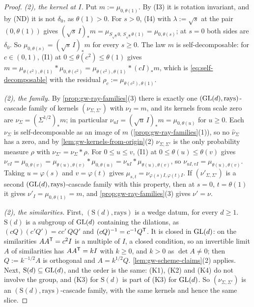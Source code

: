 \begin{proof}
\emph{(2), the kernel at $I$.} Put $m := \mu_{0,\theta(1)}$. By (I3) it is rotation invariant, and
by (ND) it is not $\delta_0$, as $\theta(1) > 0$. For $s > 0$, (I4) with $\lambda := \sqrt s$ at the
pair $(0, \theta(1))$ gives
$(\sqrt s\,I)_*m = \mu_{S_{\sqrt s}0,\,S_{\sqrt s}\theta(1)} = \mu_{0,\theta(s)}$; at $s = 0$ both
sides are $\delta_0$. So $\mu_{0,\theta(s)} = (\sqrt s\,I)_*m$ for every $s \ge 0$. The law $m$ is
self-decomposable: for $c \in (0,1)$, (I1) at $0 \le \theta(c^2) \le \theta(1)$ gives
$m = \mu_{\theta(c^2),\theta(1)} * \mu_{0,\theta(c^2)} = \mu_{\theta(c^2),\theta(1)} * (cI)_*m$, which
is \ref{eq:self-decomposable} with the residual $\rho_c := \mu_{\theta(c^2),\theta(1)}$.

\emph{(2), the family.} By \ref{prop:gw-ray-families}(3) there is exactly one
$(\mathrm{GL}(d), \text{rays})$-cascade family of kernels $(\nu_{\Sigma,\Sigma'})$ with $\nu_I = m$, and its
kernels from scale zero are $\nu_\Sigma = (\Sigma^{1/2})_*m$; in particular
$\nu_{uI} = (\sqrt u\,I)_*m = \mu_{0,\theta(u)}$ for $u \ge 0$. Each $\nu_\Sigma$ is
self-decomposable as an image of $m$ (\ref{prop:gw-ray-families}(1)), so no $\widehat\nu_\Sigma$ has
a zero, and by \ref{lem:gw-kernels-from-origin}(2) $\nu_{\Sigma,\Sigma'}$ is the only probability
measure $\rho$ with $\nu_{\Sigma'} = \nu_\Sigma * \rho$. For $0 \le u \le v$, (I1) at
$0 \le \theta(u) \le \theta(v)$ gives
$\nu_{vI} = \mu_{0,\theta(v)} = \mu_{\theta(u),\theta(v)} * \mu_{0,\theta(u)} = \nu_{uI} *
\mu_{\theta(u),\theta(v)}$, so $\nu_{uI,vI} = \mu_{\theta(u),\theta(v)}$. Taking $u = \varphi(s)$ and
$v = \varphi(t)$ gives $\mu_{s,t} = \nu_{\varphi(s)I,\varphi(t)I}$. If $(\nu'_{\Sigma,\Sigma'})$ is a
second $(\mathrm{GL}(d), \text{rays})$-cascade family with this property, then at $s = 0$, $t = \theta(1)$ it
gives $\nu'_I = \mu_{0,\theta(1)} = m$, and \ref{prop:gw-ray-families}(3) gives $\nu' = \nu$.

\emph{(2), the similarities.} First, $(\mathrm S(d), \text{rays})$ is a wedge datum, for every
$d \ge 1$. $\mathrm S(d)$ is a subgroup of $\mathrm{GL}(d)$ containing the dilations, as
$(cQ)(c'Q') = cc'\,QQ'$ and $(cQ)^{-1} = c^{-1}Q^{\mathsf{T}}$. It is closed in $\mathrm{GL}(d)$: on the
similarities $AA^{\mathsf{T}} = c^2I$ is a multiple of $I$, a closed condition, so an invertible limit $A$
of similarities has $AA^{\mathsf{T}} = kI$ with $k \ge 0$, and $k > 0$ as $\det A \ne 0$; then
$Q := k^{-1/2}A$ is orthogonal and $A = k^{1/2}Q$. \ref{lem:gw-scheme-claims}(2) applies. Next,
$\mathrm S(d) \subseteq \mathrm{GL}(d)$, and the order is the same: (K1), (K2) and (K4) do not involve the
group, and (K3) for $\mathrm S(d)$ is part of (K3) for $\mathrm{GL}(d)$. So $(\nu_{\Sigma,\Sigma'})$ is an
$(\mathrm S(d), \text{rays})$-cascade family, with the same kernels and hence the same slice.


\end{proof}
